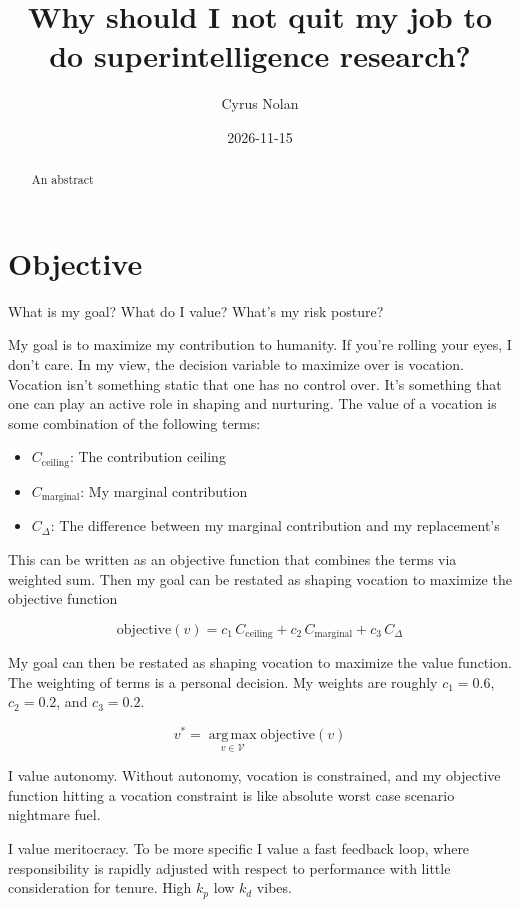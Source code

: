 \documentclass{article}
\title{Why should I not quit my job to do superintelligence research?}
\author{Cyrus Nolan}
\date{2026-11-15}
\begin{document}
\maketitle

\begin{abstract}

An abstract

\end{abstract}

\section*{Objective}

What is my goal? What do I value? What's my risk posture?

My goal is to maximize my contribution to humanity. If you're rolling your eyes, I don't care. In my view, the decision variable to maximize over is vocation. Vocation isn't something static that one has no control over. It's something that one can play an active role in shaping and nurturing. The value of a vocation is some combination of the following terms:

\begin{itemize}
  \item $C_{\mathrm{ceiling}}$: The contribution ceiling
  \item $C_{\mathrm{marginal}}$: My marginal contribution
  \item $C_{\Delta}$: The difference between my marginal contribution and my replacement's
\end{itemize}

This can be written as an objective function that combines the terms via weighted sum. Then my goal can be restated as shaping vocation to maximize the objective function

\[
  \text{objective}(v) = c_1 \, C_{\mathrm{ceiling}} + c_2 \, C_{\mathrm{marginal}} + c_3 \, C_{\Delta}
\]

My goal can then be restated as shaping vocation to maximize the value function. The weighting of terms is a personal decision. My weights are roughly $c_1 = 0.6$, $c_2 = 0.2$, and $c_3 = 0.2$.

\[
  v^* = \operatorname*{arg\,max}_{v \in \mathcal{V}} \text{objective}(v)
\]

I value autonomy. Without autonomy, vocation is constrained, and my objective function hitting a vocation constraint is like absolute worst case scenario nightmare fuel.

I value meritocracy. To be more specific I value a fast feedback loop, where responsibility is rapidly adjusted with respect to performance with little consideration for tenure. High $k_p$ low $k_d$ vibes.
\end{document}
